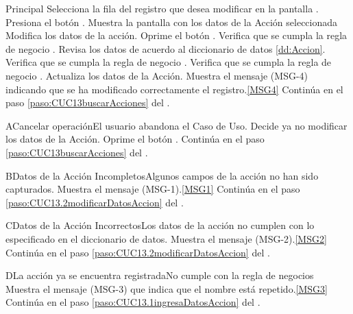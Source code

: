 	\begin{UCtrayectoria}{Principal}
			\UCpaso[\UCactor] Selecciona la fila del registro que desea modificar en la pantalla .	
			\UCpaso[\UCactor] Presiona el botón . 
			\UCpaso Muestra la pantalla  con los datos de la Acción seleccionada
                        \UCpaso [\UCactor] Modifica los datos de la acción.\label{paso:CUC13.2modificarDatosAccion}
			\UCpaso [\UCactor] Oprime el botón .
			\UCpaso Verifica que se cumpla la regla de negocio .  
			\UCpaso Revisa los datos de acuerdo al diccionario de datos \ref{dd:Accion}. 
			\UCpaso Verifica que se cumpla la regla de negocio .  
			\UCpaso Verifica que se cumpla la regla de negocio .  
			\UCpaso Actualiza los datos de la Acción.
			\UCpaso Muestra el mensaje (MSG-4) indicando que se ha modificado correctamente el registro.\ref{MSG4}
			\UCpaso Continúa en el paso \ref{paso:CUC13buscarAcciones} del .
	\end{UCtrayectoria}

		\begin{UCtrayectoriaA}{A}{Cancelar operación}{El usuario abandona el Caso de Uso.}
			\UCpaso[\UCactor] Decide ya no modificar los datos de la Acción.
			\UCpaso[\UCactor] Oprime el botón .
			\UCpaso Continúa en el paso \ref{paso:CUC13buscarAcciones} del .
		\end{UCtrayectoriaA}

	\begin{UCtrayectoriaA}{B}{Datos de la Acción Incompletos}{Algunos campos de la acción no han sido capturados.}
			\UCpaso Muestra el mensaje (MSG-1).\ref{MSG1}
			\UCpaso Continúa en el paso \ref{paso:CUC13.2modificarDatosAccion} del .
	\end{UCtrayectoriaA}

	\begin{UCtrayectoriaA}{C}{Datos de la Acción Incorrectos}{Los datos de la acción no cumplen con lo especificado en el diccionario de datos.}
			\UCpaso Muestra el mensaje (MSG-2).\ref{MSG2}
			\UCpaso Continúa en el paso \ref{paso:CUC13.2modificarDatosAccion} del .
	\end{UCtrayectoriaA}
		\begin{UCtrayectoriaA}{D}{La acción ya se encuentra registrada}{No cumple con la regla de negocios }
			\UCpaso Muestra el mensaje (MSG-3) que indica que el nombre está repetido.\ref{MSG3}
			\UCpaso Continúa en el paso \ref{paso:CUC13.1ingresaDatosAccion} del .
		\end{UCtrayectoriaA}

